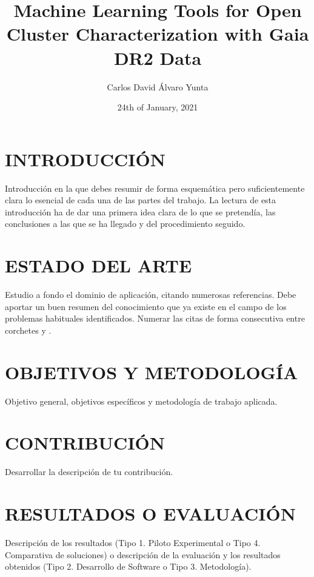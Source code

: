 \documentclass[11pt,a4paper,USenglish,twocolumn]{article}
\title{Machine Learning Tools for Open Cluster Characterization with Gaia DR2 Data}
\author{Carlos David Álvaro Yunta}
\date{24th of January, 2021}
\begin{document}
\twocolumn[
\begin{@twocolumnfalse}
\maketitle
\end{@twocolumnfalse}
]




\section{INTRODUCCIÓN}
Introducción en la que debes resumir de forma esquemática pero suficientemente clara lo esencial de cada una de las partes del trabajo.
La lectura de esta introducción ha de dar una primera idea clara de lo que se pretendía, las conclusiones a las que se ha llegado y del procedimiento seguido.

\section{ESTADO DEL ARTE}
Estudio a fondo el dominio de aplicación, citando numerosas referencias.
Debe aportar un buen resumen del conocimiento que ya existe en el campo de los problemas habituales identificados.
Numerar las citas de forma consecutiva entre corchetes \cite{Chen} y \cite{young}.
\section{OBJETIVOS Y METODOLOGÍA}
Objetivo general, objetivos específicos y metodología de trabajo aplicada.

\section{CONTRIBUCIÓN}
Desarrollar la descripción de tu contribución.

\section{RESULTADOS O EVALUACIÓN }
Descripción de los resultados (Tipo 1. Piloto Experimental o Tipo 4. Comparativa de soluciones) o descripción de la evaluación y los resultados obtenidos (Tipo 2. Desarrollo de Software o Tipo 3. Metodología).
\end{document}
